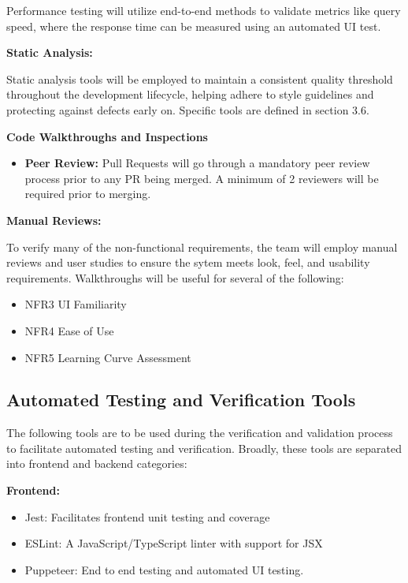 \documentclass[12pt, titlepage]{article}
\begin{document}
Performance testing will utilize end-to-end methods to validate metrics like query speed, where the response time can be measured using an automated UI test. 

\textbf{Static Analysis:}

Static analysis tools will be employed to maintain a consistent quality threshold throughout the development lifecycle, helping adhere to style guidelines and protecting against defects early on. Specific tools are defined in section 3.6.  

\textbf{Code Walkthroughs and Inspections}

\begin{itemize}
  \item \textbf{Peer Review:} Pull Requests will go through a mandatory peer review process prior to any PR being merged. A minimum of 2 reviewers will be required prior to merging.  
\end{itemize}

\textbf{Manual Reviews:}

To verify many of the non-functional requirements, the team will employ manual reviews and user studies to ensure the sytem meets look, feel, and usability requirements.  Walkthroughs will be useful for several of the following: 

\begin{itemize}
    \item NFR3 UI Familiarity
  \item NFR4 Ease of Use
 \item NFR5 Learning Curve Assessment
\end{itemize}


\subsection{Automated Testing and Verification Tools}

The following tools are to be used during the verification and validation process to facilitate automated testing and verification. Broadly, these tools are separated into frontend and backend categories:

\textbf{Frontend:}
\begin{itemize}
  \item Jest: Facilitates frontend unit testing and coverage 
  \item ESLint: A JavaScript/TypeScript linter with support for JSX
  \item Puppeteer: End to end testing and automated UI testing.
\end{itemize}
\end{document}
